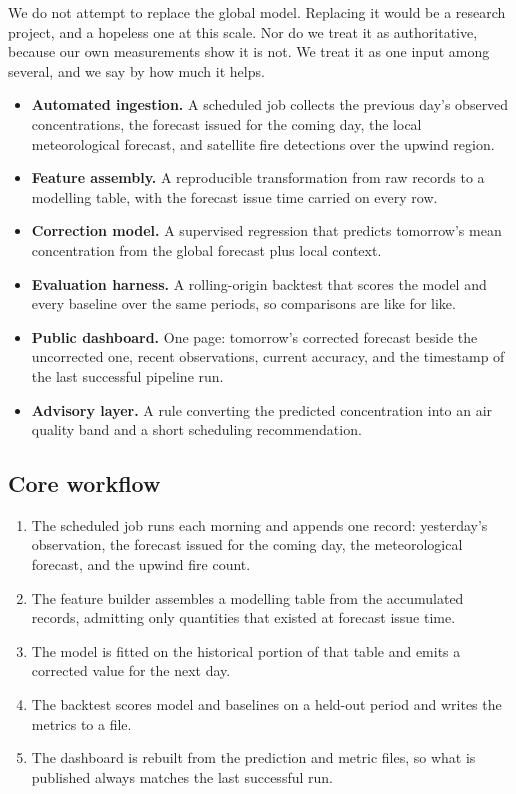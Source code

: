 \documentclass[11pt,a4paper]{article}
\begin{document}
We do not attempt to replace the global model. Replacing it
would be a research project, and a hopeless one at this scale.
Nor do we treat it as authoritative, because our own
measurements show it is not. We treat it as one input among
several, and we say by how much it helps.

\begin{itemize}[leftmargin=0.7cm]
  \item \textbf{Automated ingestion.} A scheduled job
    collects the previous day's observed concentrations,
    the forecast issued for the coming day, the local
    meteorological forecast, and satellite fire
    detections over the upwind region.
  \item \textbf{Feature assembly.} A reproducible
    transformation from raw records to a modelling
    table, with the forecast issue time carried on every
    row.
  \item \textbf{Correction model.} A supervised
    regression that predicts tomorrow's mean
    concentration from the global forecast plus local
    context.
  \item \textbf{Evaluation harness.} A rolling-origin
    backtest that scores the model and every baseline
    over the same periods, so comparisons are like for
    like.
  \item \textbf{Public dashboard.} One page: tomorrow's
    corrected forecast beside the uncorrected one,
    recent observations, current accuracy, and the
    timestamp of the last successful pipeline run.
  \item \textbf{Advisory layer.} A rule converting the
    predicted concentration into an air quality band and
    a short scheduling recommendation.
\end{itemize}

\subsection{Core workflow}
\begin{enumerate}[leftmargin=0.7cm]
  \item The scheduled job runs each morning and appends
    one record: yesterday's observation, the forecast
    issued for the coming day, the meteorological
    forecast, and the upwind fire count.
  \item The feature builder assembles a modelling table
    from the accumulated records, admitting only
    quantities that existed at forecast issue time.
  \item The model is fitted on the historical portion of
    that table and emits a corrected value for the next
    day.
  \item The backtest scores model and baselines on a
    held-out period and writes the metrics to a file.
  \item The dashboard is rebuilt from the prediction and
    metric files, so what is published always matches
    the last successful run.
\end{enumerate}
\end{document}
